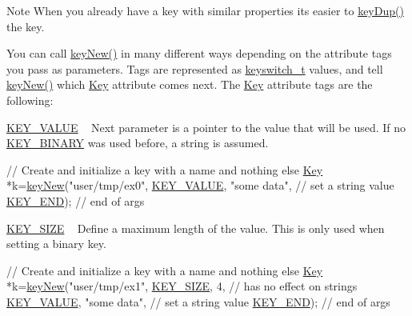 \begin{DoxyNote}{Note}
When you already have a key with similar properties its easier to \hyperlink{group__key_gae6ec6a60cc4b8c1463fa08623d056ce3}{key\+Dup()} the key.
\end{DoxyNote}
You can call \hyperlink{group__key_gad23c65b44bf48d773759e1f9a4d43b89}{key\+New()} in many different ways depending on the attribute tags you pass as parameters. Tags are represented as \hyperlink{group__key_ga91fb3178848bd682000958089abbaf40}{keyswitch\+\_\+t} values, and tell \hyperlink{group__key_gad23c65b44bf48d773759e1f9a4d43b89}{key\+New()} which \hyperlink{classkdb_1_1Key}{Key} attribute comes next. The \hyperlink{classkdb_1_1Key}{Key} attribute tags are the following\+:
\begin{DoxyItemize}
\item \hyperlink{group__key_gga91fb3178848bd682000958089abbaf40ac66e4a49d09212b79f5754ca6db5bd2e}{K\+E\+Y\+\_\+\+V\+A\+L\+UE} ~\newline
 Next parameter is a pointer to the value that will be used. If no \hyperlink{group__key_gga91fb3178848bd682000958089abbaf40a1ca18d4e094ae7487d35ecedda2235ff}{K\+E\+Y\+\_\+\+B\+I\+N\+A\+RY} was used before, a string is assumed. 
\begin{DoxyCodeInclude}
\textcolor{comment}{// Create and initialize a key with a name and nothing else}
\hyperlink{classkdb_1_1Key_a5679f5cae63caddd64a60388b9cc77fa}{Key} *k=\hyperlink{group__key_gad23c65b44bf48d773759e1f9a4d43b89}{keyNew}(\textcolor{stringliteral}{"user/tmp/ex0"},
        \hyperlink{group__key_gga91fb3178848bd682000958089abbaf40ac66e4a49d09212b79f5754ca6db5bd2e}{KEY\_VALUE}, \textcolor{stringliteral}{"some data"},    \textcolor{comment}{// set a string value}
        \hyperlink{group__key_gga91fb3178848bd682000958089abbaf40aa8adb6fcb92dec58fb19410eacfdd403}{KEY\_END});                  \textcolor{comment}{// end of args}
\end{DoxyCodeInclude}

\item \hyperlink{group__key_gga91fb3178848bd682000958089abbaf40a6d531b5c41445d19d0452eebdccbfa01}{K\+E\+Y\+\_\+\+S\+I\+ZE} ~\newline
 Define a maximum length of the value. This is only used when setting a binary key. 
\begin{DoxyCodeInclude}
\textcolor{comment}{// Create and initialize a key with a name and nothing else}
\hyperlink{classkdb_1_1Key_a5679f5cae63caddd64a60388b9cc77fa}{Key} *k=\hyperlink{group__key_gad23c65b44bf48d773759e1f9a4d43b89}{keyNew}(\textcolor{stringliteral}{"user/tmp/ex1"},
        \hyperlink{group__key_gga91fb3178848bd682000958089abbaf40a6d531b5c41445d19d0452eebdccbfa01}{KEY\_SIZE}, 4,               \textcolor{comment}{// has no effect on strings}
        \hyperlink{group__key_gga91fb3178848bd682000958089abbaf40ac66e4a49d09212b79f5754ca6db5bd2e}{KEY\_VALUE}, \textcolor{stringliteral}{"some data"},    \textcolor{comment}{// set a string value}
        \hyperlink{group__key_gga91fb3178848bd682000958089abbaf40aa8adb6fcb92dec58fb19410eacfdd403}{KEY\_END});                  \textcolor{comment}{// end of args}
\end{DoxyCodeInclude}


\end{DoxyItemize}
